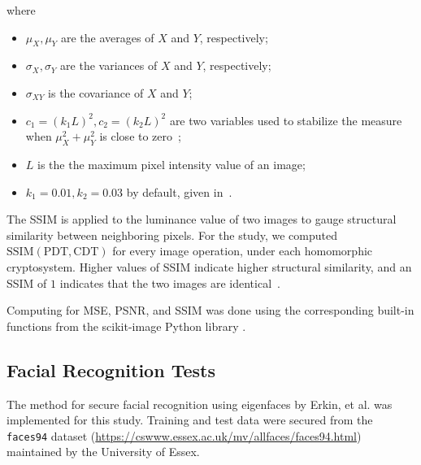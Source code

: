 \begin{description}
	where
	\begin{itemize}
		\item $\mu_X, \mu_Y$ are the averages of $X$ and $Y$, respectively;
		\item $\sigma_X, \sigma_Y$ are the variances of $X$ and $Y$, respectively;
		\item $\sigma_{XY}$ is the covariance of $X$ and $Y$;
		\item $c_1 = (k_1L)^2, c_2 = (k_2L)^2$ are two variables used to stabilize the measure when $\mu_X^2+\mu_Y^2$ is close to zero~\cite{akramullah_video_2014};
		\item $L$ is the the maximum pixel intensity value of an image;
		\item $k_1 = 0.01, k_2 = 0.03$ by default, given in~\cite{ahmed_benchmark_2016}.
	\end{itemize}
	The SSIM is applied to the luminance value of two images to gauge structural similarity between neighboring pixels.
	For the study, we computed $\mathrm{SSIM}(\mathrm{PDT}, \mathrm{CDT})$ for every image operation, under each homomorphic cryptosystem. Higher values of SSIM indicate higher structural similarity, and an SSIM of $1$ indicates that the two images are identical~\cite{ahmed_benchmark_2016}.
\end{description}

Computing for MSE, PSNR, and SSIM was done using the corresponding built-in functions from the scikit-image Python library \cite{scikit-image}.

\subsection{Facial Recognition Tests}
The method for secure facial recognition using eigenfaces by Erkin, et al. \cite{hutchison_privacy-preserving_2009-2} was implemented for this study.
Training and test data were secured from the \texttt{faces94} dataset (\url{https://cswww.essex.ac.uk/mv/allfaces/faces94.html}) maintained by the University of Essex. 



